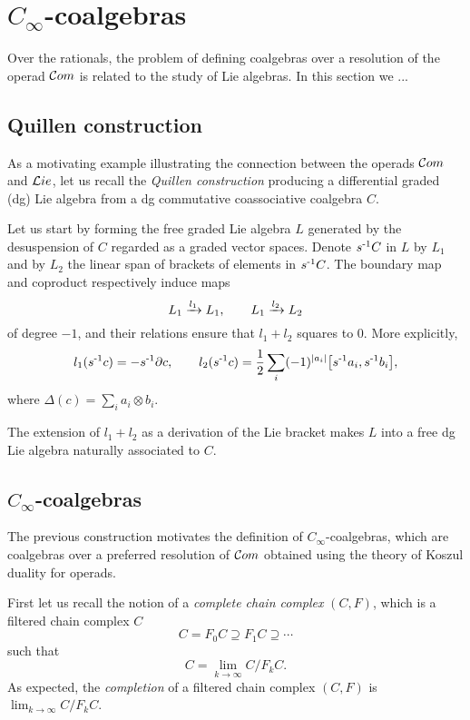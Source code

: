 
\section{\texorpdfstring{$C_\infty$}{C-infty}-coalgebras} \label{s:rationally}

Over the rationals, the problem of defining coalgebras over a resolution of the operad $\mathcal{C}om$ is related to the study of Lie algebras.
In this section we ...

\subsection{Quillen construction}

As a motivating example illustrating the connection between the operads $\mathcal{C}om$ and $\mathcal{L}ie$, let us recall the \textit{Quillen construction} producing a differential graded (dg) Lie algebra from a dg commutative coassociative coalgebra $C$.

Let us start by forming the free graded Lie algebra $L$ generated by the desuspension of $C$ regarded as a graded vector spaces.
Denote $s^{\mbox{\scriptsize -1}}C$ in $L$ by $L_1$ and by $L_2$ the linear span of brackets of elements in $s^{\mbox{\scriptsize -1}}C$.
The boundary map and coproduct respectively induce maps
\[
L_1 \xrightarrow{l_1} L_1,
\qquad
L_1 \xrightarrow{l_2} L_2
\]
of degree $-1$, and their relations ensure that $l_1 + l_2$ squares to $0$.
More explicitly,
\[
l_1(s^{\mbox{\scriptsize -1}}c) = -s^{\mbox{\scriptsize -1}} \partial c,
\qquad
l_2(s^{\mbox{\scriptsize -1}}c) = \frac{1}{2} \sum_i (-1)^{\lvert a_i\rvert} \big[ s^{\mbox{\scriptsize -1}}a_i, s^{\mbox{\scriptsize -1}}b_i \big],
\]
where $\Delta(c) = \sum_i a_i \otimes b_i$.

The extension of $l_1 + l_2$ as a derivation of the Lie bracket makes $L$ into a free dg Lie algebra naturally associated to $C$.

\subsection{\texorpdfstring{$C_\infty$}{C-infinity}-coalgebras} \label{ss:c-infty definition}

The previous construction motivates the definition of $C_\infty$-coalgebras, which are coalgebras over a preferred resolution of $\mathcal{C}om$ obtained using the theory of Koszul duality for operads.

First let us recall the notion of a \textit{complete chain complex} $(C, F)$, which is a filtered chain complex $C$
\[
C = F_0 C \supseteq F_1 C \supseteq \cdots
\]
such that
\[
C = \lim_{k\to \infty} C / F_k C.
\]
As expected, the \textit{completion} of a filtered chain complex $(C, F)$ is $\lim_{k\to \infty} C / F_k C$.

